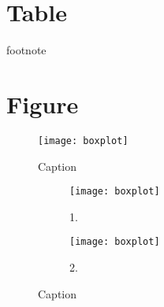 \section{Table}

\begin{table}[htb]
    \caption{\normalsize Caption.}
    \centering
    \begin{threeparttable}
    \begin{tablenotes}
        \footnotesize{footnote}
    \end{tablenotes}
    \end{threeparttable}
    \label{table: label}
\end{table}


\section{Figure}

\begin{figure}[htb]
    \centering
    \texttt{[image: boxplot]}
    \caption{Caption}
    \label{figure: 1}
\end{figure}

\begin{figure}[htp]
    \centering
    \begin{subfigure}{0.49\textwidth}
      \texttt{[image: boxplot]}
      \caption{1.}
    \end{subfigure}
    \begin{subfigure}{0.49\textwidth}
      \texttt{[image: boxplot]}
      \caption{2.}
    \end{subfigure}
    \caption{Caption}
    \label{figure: 2}
\end{figure}
  
